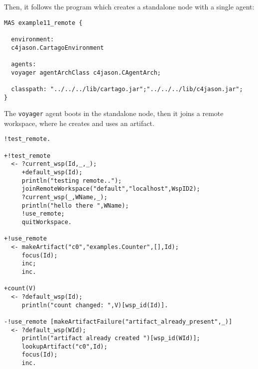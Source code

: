 \documentclass[11pt]{report}
\newcommand\code[1]{{\small{\mbox{\texttt{{#1}}}}}}
\newcommand{\jason}{\mbox{\sf{\emph{{Jason}}}}}
\newcommand{\cartago}{\mbox{\sf{CArtAgO}}}
\begin{document}
\noindent Then, it follows the {\jason} program which creates a standalone {\cartago} node with a single agent:
{\small{
\begin{verbatim}
MAS example11_remote {

  environment: 
  c4jason.CartagoEnvironment

  agents:  
  voyager agentArchClass c4jason.CAgentArch;

  classpath: "../../../lib/cartago.jar";"../../../lib/c4jason.jar";    
}
\end{verbatim}}}
%
\noindent The \code{voyager} agent boots in the standalone node, then it joins a remote workspace, where he creates and uses an artifact. 
%
{\small{\begin{verbatim}
!test_remote.

+!test_remote 
  <- ?current_wsp(Id,_,_);
     +default_wsp(Id);
     println("testing remote..");
     joinRemoteWorkspace("default","localhost",WspID2);
     ?current_wsp(_,WName,_);
     println("hello there ",WName);
     !use_remote;
     quitWorkspace.
      
+!use_remote 
  <- makeArtifact("c0","examples.Counter",[],Id);
     focus(Id);
     inc;
     inc.

+count(V) 
  <- ?default_wsp(Id);
     println("count changed: ",V)[wsp_id(Id)].
  
-!use_remote [makeArtifactFailure("artifact_already_present",_)]
  <- ?default_wsp(WId);
     println("artifact already created ")[wsp_id(WId)];
     lookupArtifact("c0",Id);
     focus(Id);
     inc.   
\end{verbatim}}}
%
\end{document}
